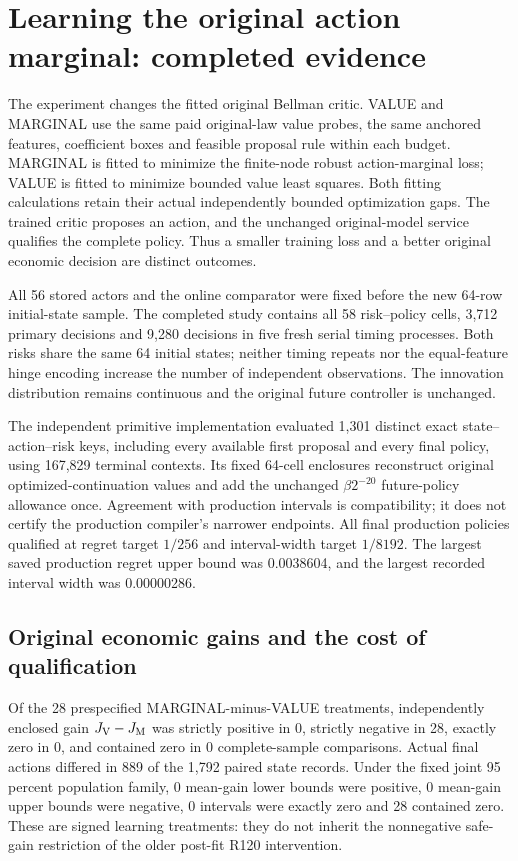 \section{Learning the original action marginal: completed evidence}\label{sec:results121}

The experiment changes the fitted original Bellman critic. VALUE and MARGINAL use the same paid original-law value probes, the same anchored features, coefficient boxes and feasible proposal rule within each budget. MARGINAL is fitted to minimize the finite-node robust action-marginal loss; VALUE is fitted to minimize bounded value least squares. Both fitting calculations retain their actual independently bounded optimization gaps. The trained critic proposes an action, and the unchanged original-model service qualifies the complete policy. Thus a smaller training loss and a better original economic decision are distinct outcomes.

All 56 stored actors and the online comparator were fixed before the new 64-row initial-state sample. The completed study contains all 58 risk--policy cells, 3,712 primary decisions and 9,280 decisions in five fresh serial timing processes. Both risks share the same 64 initial states; neither timing repeats nor the equal-feature hinge encoding increase the number of independent observations. The innovation distribution remains continuous and the original future controller is unchanged.

The independent primitive implementation evaluated 1,301 distinct exact state--action--risk keys, including every available first proposal and every final policy, using 167,829 terminal contexts. Its fixed 64-cell enclosures reconstruct original optimized-continuation values and add the unchanged $\beta 2^{-20}$ future-policy allowance once. Agreement with production intervals is compatibility; it does not certify the production compiler's narrower endpoints. All final production policies qualified at regret target $1/256$ and interval-width target $1/8192$. The largest saved production regret upper bound was 0.0038604, and the largest recorded interval width was 0.00000286.

\subsection{Original economic gains and the cost of qualification}\label{subsec:learninggains121}

Of the 28 prespecified MARGINAL-minus-VALUE treatments, independently enclosed gain $J_{\rm V}-J_{\rm M}$ was strictly positive in 0, strictly negative in 28, exactly zero in 0, and contained zero in 0 complete-sample comparisons. Actual final actions differed in 889 of the 1,792 paired state records. Under the fixed joint 95 percent population family, 0 mean-gain lower bounds were positive, 0 mean-gain upper bounds were negative, 0 intervals were exactly zero and 28 contained zero. These are signed learning treatments: they do not inherit the nonnegative safe-gain restriction of the older post-fit R120 intervention.


